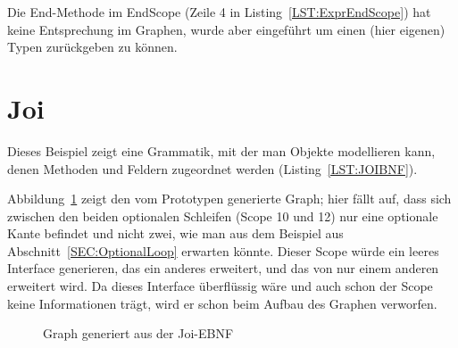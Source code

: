 \documentclass[../InterneDSLs.tex]{subfiles}
\begin{document}
Die End-Methode im EndScope (Zeile 4 in Listing~\ref{LST:ExprEndScope}) hat keine Entsprechung im Graphen, wurde aber eingeführt um einen (hier eigenen) Typen zurückgeben zu können.
\begin{figure}[ht]
    
\end{figure}


\section{Joi}
Dieses Beispiel zeigt eine Grammatik, mit der man Objekte modellieren kann, denen Methoden und Feldern zugeordnet werden (Listing~\ref{LST:JOIBNF}).
\begin{figure}[ht]
    
\end{figure}

Abbildung~\ref{FIG:JoiGraph} zeigt den vom Prototypen generierte Graph; hier fällt auf, dass sich zwischen den beiden optionalen Schleifen (Scope 10 und 12) nur eine optionale Kante befindet und nicht zwei, wie man aus dem Beispiel aus Abschnitt~\ref{SEC:OptionalLoop} erwarten könnte. Dieser Scope würde ein leeres Interface generieren, das ein anderes erweitert, und das von nur einem anderen erweitert wird. Da dieses Interface überflüssig wäre und auch schon der Scope keine Informationen trägt, wird er schon beim Aufbau des Graphen verworfen.
\begin{figure}[ht]
\centering
\resizebox{0.5\linewidth}{!}{}
\caption{Graph generiert aus der Joi-EBNF}
\label{FIG:JoiGraph}
\end{figure}
\end{document}

